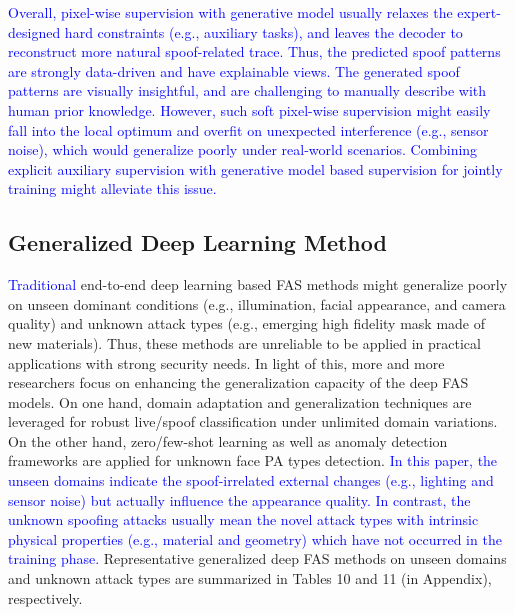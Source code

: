 \documentclass[10pt,journal,compsoc]{IEEEtran}
\begin{document}
\textcolor{blue}{Overall, pixel-wise supervision with generative model usually relaxes the expert-designed hard constraints (e.g., auxiliary tasks), and leaves the decoder to reconstruct more natural spoof-related trace. Thus, the predicted spoof patterns are strongly data-driven and have explainable views. The generated spoof patterns are visually insightful, and are challenging to manually describe with human prior knowledge. However, such soft pixel-wise supervision might easily fall into the local optimum and overfit on unexpected interference (e.g., sensor noise), which would generalize poorly under real-world scenarios. Combining explicit auxiliary supervision with generative model based supervision for jointly training might alleviate this issue.}





\subsection{Generalized Deep Learning Method}









\textcolor{blue}{Traditional} end-to-end deep learning based FAS methods might generalize poorly on unseen dominant conditions (e.g., illumination, facial appearance, and camera quality) and unknown attack types (e.g., emerging high fidelity mask made of new materials). Thus, these methods are unreliable to be applied in practical applications with strong security needs. In light of this, more and more researchers focus on enhancing the generalization capacity of the deep FAS models. On one hand, domain adaptation and generalization techniques are leveraged for robust live/spoof classification under unlimited domain variations. On the other hand, zero/few-shot learning as well as anomaly detection frameworks are applied for unknown face PA types detection. \textcolor{blue}{In this paper, the unseen domains indicate the spoof-irrelated external changes (e.g., lighting and sensor noise) but actually influence the appearance quality. In contrast, the unknown spoofing attacks usually mean the novel attack types with intrinsic physical properties (e.g., material and geometry) which have not occurred in the training phase.} Representative generalized deep FAS methods on unseen domains and unknown attack types are summarized in Tables 10 and 11 (in Appendix), respectively.  
\end{document}
